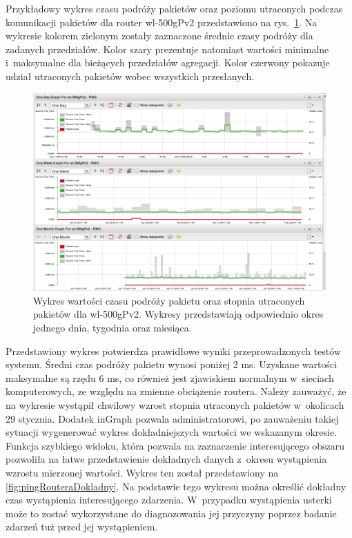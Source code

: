 Przykładowy wykres czasu podróży pakietów oraz poziomu utraconych
podczas komunikacji pakietów dla router wl-500gPv2 przedstawiono na
rys.~\ref{fig:pingRoutera}. Na wykresie kolorem zielonym zostały
zaznaczone średnie czasy podróży dla zadanych przedziałów. Kolor szary
prezentuje natomiast wartości minimalne i~maksymalne dla bieżących
przedziałów agregacji. Kolor czerwony pokazuje udział utraconych
pakietów wobec wszystkich przesłanych.

\begin{figure}[ht]
  \caption{Wykres wartości czasu podróży pakietu oraz stopnia
    utraconych pakietów dla wl-500gPv2. Wykresy przedstawiają
    odpowiednio okres jednego dnia, tygodnia oraz miesiąca.}
  \label{fig:pingRoutera}
  \centering
\includegraphics[width=1\textwidth]{img/pingRoutera.png}
\end{figure}

Przedstawiony wykres potwierdza prawidłowe wyniki przeprowadzonych
testów systemu. Średni czas podróży pakietu wynosi poniżej 2
ms. Uzyskane wartości maksymalne są rzędu 6 ms, co również jest
zjawiskiem normalnym w~sieciach komputerowych, ze względu na zmienne
obciążenie routera. Należy zauważyć, że na wykresie wystąpił chwilowy
wzrost stopnia utraconych pakietów w~okolicach 29 stycznia. Dodatek
inGraph pozwala administratorowi, po zauważeniu takiej sytuacji
wygenerować wykres dokładniejszych wartości we wskazanym
okresie. Funkcja szybkiego widoku, która pozwala na zaznaczenie
interesującego obszaru pozwoliła na łatwe przedstawienie dokładnych
danych z~okresu wystąpienia wzrostu mierzonej wartości. Wykres ten
został przedstawiony na \ref{fig:pingRouteraDokladny}. Na podstawie
tego wykresu można określić dokładny czas wystąpienia interesującego
zdarzenia. W~przypadku wystąpienia usterki może to zostać
wykorzystane do diagnozowania jej przyczyny poprzez badanie zdarzeń
tuż przed jej wystąpieniem.

